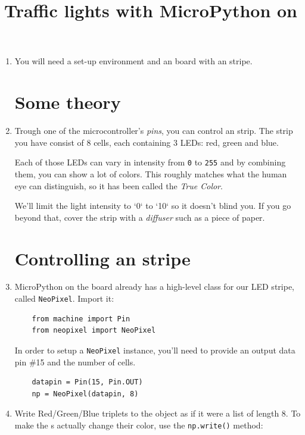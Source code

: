 \documentclass{../tutorial}
\title{Traffic lights with MicroPython on \abbr{ESP32}}
\begin{document}
\begin{enumerate}

\item
    You will need a set-up environment and an  board
    with an   stripe.

\section{Some theory}

\item
    Trough one of the microcontroller's \emph{pins},
    you can control an   strip.
    The strip you have consist of 8 cells,
    each containing 3 LEDs: red, green and blue.

    Each of those LEDs can vary in intensity from \lstinline|0| to \lstinline|255|
    and by combining them, you can show a lot of colors.
    This roughly matches what the human eye can distinguish,
    so it has been called the \emph{True Color}.

    We'll limit the light intensity to `0` to `10` so it doesn't blind you.
    If you go beyond that, cover the strip with a \emph{diffuser} such as
    a piece of paper.

\section{Controlling an   stripe}

\item
    MicroPython on the  board already has a high-level class for
    our LED stripe, called \lstinline|NeoPixel|. Import it:

    \begin{lstlisting}
    from machine import Pin
    from neopixel import NeoPixel
    \end{lstlisting}

    In order to setup a \lstinline|NeoPixel| instance,
    you'll need to provide an output data pin \#15 and the number of cells.

    \begin{lstlisting}
    datapin = Pin(15, Pin.OUT)
    np = NeoPixel(datapin, 8)
    \end{lstlisting}

\item
    Write Red/Green/Blue triplets to the object as if it were a list of length 8.
    To make the s actually change their color,
    use the \lstinline|np.write()| method:


\end{enumerate}
\end{document}
